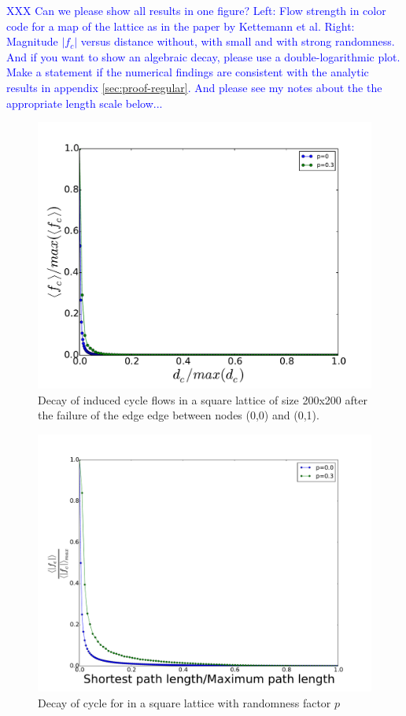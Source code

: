 \documentclass[10pt,aps,pra,twocolumn,superscriptaddress]{revtex4-1}
\newcommand{\dirk}[1]{\textcolor{blue}{#1}}
\begin{document}
\dirk{XXX Can we please show all results in one figure? Left: Flow strength in color code
for a map of the lattice as in the paper by Kettemann et al. Right: Magnitude $|f_c|$ versus
distance without, with small and with strong randomness. And if you want to show an 
algebraic decay, please use a double-logarithmic plot. Make a statement if the numerical 
findings are consistent with the analytic results in appendix \ref{sec:proof-regular}.
And please see my notes  about the the appropriate length scale below...}

\begin{figure}
    \includegraphics[width=.9\columnwidth]{pics/decay_sqgrid}
    \caption{Decay of induced cycle flows in a square lattice of size 200x200 after the 
        failure of the edge edge between nodes (0,0) and (0,1).}
    \label{fig-decay-sqlat}
\end{figure}


\begin{figure}
    \includegraphics[width=.9\columnwidth]{pics/decay_2p}	
    \caption{Decay of cycle for in a square lattice with randomness factor $p$}
    \label{fig-decay-2p}
\end{figure}
\end{document}
